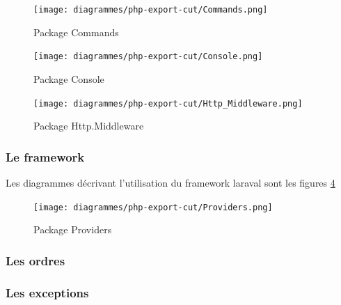 			\begin{figure}[!h]
				\centering
                \texttt{[image: diagrammes/php-export-cut/Commands.png]}
                \caption{\label{pcommands}Package Commands}
			\end{figure}

			\begin{figure}[!h]
				\centering
                \texttt{[image: diagrammes/php-export-cut/Console.png]}
                \caption{\label{pconsole}Package Console}
			\end{figure}

			\begin{figure}[!h]
				\centering
                \texttt{[image: diagrammes/php-export-cut/Http\_Middleware.png]}
                \caption{\label{phmiddleware}Package Http.Middleware}
			\end{figure}

        \newpage
        \subsubsection{Le framework}
        Les diagrammes décrivant l'utilisation du framework laraval sont les figures \ref{pproviders}
			\begin{figure}[!h]
				\centering
                \texttt{[image: diagrammes/php-export-cut/Providers.png]}
                \caption{\label{pproviders}Package Providers}
			\end{figure}
        \newpage

        \newpage
		\subsubsection{Les ordres}

        \newpage
		\subsubsection{Les exceptions}

